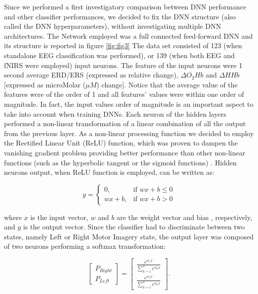 \documentclass[12pt ]{iopart}
\begin{document}
Since we performed a first investigatory comparison between DNN performance and other classifier performances, we decided to fix the DNN structure (also called the DNN hyperparameters), without investigating multiple DNN architectures.
The Network employed was a full connected feed-forward DNN and its structure is reported in figure \ref{fig:fig3}
The data set consisted of 123 (when standalone EEG classification was performed), or 139 (when both EEG and fNIRS were employed) input neurons. 
The feature of the input neurons were 1 second average ERD/ERS (expressed as relative change), $\Delta O_{2}Hb$ and $\Delta HHb$ [expressed as microMolar ($\mu M$) change]. Notice that the average value of the features were of the order of 1 and all features' values were within one order of magnitude. In fact, the input values order of magnitude is an important aspect to take into account when training DNNs.
Each neuron of the hidden layers performed a non-linear transformation of a linear combination of all the output from the previous layer. As a non-linear processing function we decided to employ the Rectified Linear Unit (ReLU) function, which was proven to dampen the vanishing gradient problem providing better performance than other non-linear functions (such as the hyperbolic tangent or the sigmoid functions) \parencite{dahl2013improving}. Hidden neurons output,  when ReLU function is employed, can be written as:

\begin{equation}
y=
\begin{cases}
0,& \text{if } wx+b \leq 0\\
wx+b,&\text{if } wx+b > 0
\end{cases}
\end{equation}

where $x$ is the input vector, $w$ and $b$ are the weight vector and bias , respectively, and $y$ is the output vector.
Since the classifier had to discriminate between two states, namely Left or Right Motor Imagery state, the output layer was composed of two neurons performing a softmax transformation:

\begin{equation}
\begin{bmatrix}
P_{Right}\\
P_{Left}
\end{bmatrix}
=
\begin{bmatrix}
\frac{e^{w_1x}}{\sum\limits_{k=1}^2 e^{w_kx}}\\
\frac{e^{w_2x}}{\sum\limits_{k=1}^2 e^{w_kx}}
\end{bmatrix}
.
\end{equation}
\end{document}
